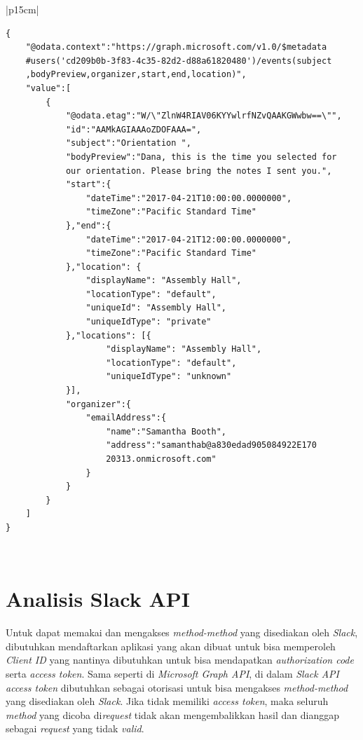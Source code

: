 \begin{table}[H]
	\centering 
	\caption{Tabel contoh \textit{response event}}
	\label{tab:contoh_response_event}
	\begin{tabular}{|p{15cm}|}
	\toprule
	\begin{lstlisting}
{
    "@odata.context":"https://graph.microsoft.com/v1.0/$metadata
    #users('cd209b0b-3f83-4c35-82d2-d88a61820480')/events(subject
    ,bodyPreview,organizer,start,end,location)",
    "value":[
        {
            "@odata.etag":"W/\"ZlnW4RIAV06KYYwlrfNZvQAAKGWwbw==\"",
            "id":"AAMkAGIAAAoZDOFAAA=",
            "subject":"Orientation ",
            "bodyPreview":"Dana, this is the time you selected for 
            our orientation. Please bring the notes I sent you.",
            "start":{
                "dateTime":"2017-04-21T10:00:00.0000000",
                "timeZone":"Pacific Standard Time"
            },"end":{
                "dateTime":"2017-04-21T12:00:00.0000000",
                "timeZone":"Pacific Standard Time"
            },"location": {
                "displayName": "Assembly Hall",
                "locationType": "default",
                "uniqueId": "Assembly Hall",
                "uniqueIdType": "private"
            },"locations": [{
                    "displayName": "Assembly Hall",
                    "locationType": "default",
                    "uniqueIdType": "unknown"
            }],                
            "organizer":{
                "emailAddress":{
                    "name":"Samantha Booth",
                    "address":"samanthab@a830edad905084922E170
                    20313.onmicrosoft.com"
                }
            }
        }
    ]
}
\end{lstlisting}\\
	\bottomrule
	\end{tabular}  
\end{table}

\section{Analisis Slack API}
\label{sec:analisis_slack_api}
Untuk dapat memakai dan mengakses \textit{method-method} yang disediakan oleh \textit{Slack}, dibutuhkan mendaftarkan aplikasi yang akan dibuat untuk bisa memperoleh \textit{Client ID} yang nantinya dibutuhkan untuk bisa mendapatkan \textit{authorization code} serta \textit{access token}. Sama seperti di \textit{Microsoft Graph API}, di dalam \textit{Slack API access token} dibutuhkan sebagai otorisasi untuk bisa mengakses \textit{method-method} yang disediakan oleh \textit{Slack}. Jika tidak memiliki \textit{access token}, maka seluruh \textit{method} yang dicoba di\textit{request} tidak akan mengembalikkan hasil dan dianggap sebagai \textit{request} yang tidak \textit{valid}. 

